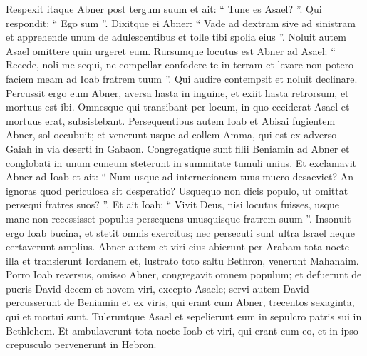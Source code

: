 \begin{biblechapter}
\begin{biblechapter}
\verse Respexit itaque Abner post tergum suum et ait: “ Tune es Asael? ”. Qui respondit: “ Ego sum ”. 
\verse Dixitque ei Abner: “ Vade ad dextram sive ad sinistram et apprehende unum de adulescentibus et tolle tibi spolia eius ”. Noluit autem Asael omittere quin urgeret eum. 
\verse Rursumque locutus est Abner ad Asael: “ Recede, noli me sequi, ne compellar confodere te in terram et levare non potero faciem meam ad Ioab fratrem tuum ”. 
\verse Qui audire contempsit et noluit declinare. Percussit ergo eum Abner, aversa hasta in inguine, et exiit hasta retrorsum, et mortuus est ibi. Omnesque qui transibant per locum, in quo ceciderat Asael et mortuus erat, subsistebant.
 \verse Persequentibus autem Ioab et Abisai fugientem Abner, sol occubuit; et venerunt usque ad collem Amma, qui est ex adverso Gaiah in via deserti in Gabaon. 
\verse Congregatique sunt filii Beniamin ad Abner et conglobati in unum cuneum steterunt in summitate tumuli unius. 
\verse Et exclamavit Abner ad Ioab et ait: “ Num usque ad internecionem tuus mucro desaeviet? An ignoras quod periculosa sit desperatio? Usquequo non dicis populo, ut omittat persequi fratres suos? ”. 
\verse Et ait Ioab: “ Vivit Deus, nisi locutus fuisses, usque mane non recessisset populus persequens unusquisque fratrem suum ”. 
\verse Insonuit ergo Ioab bucina, et stetit omnis exercitus; nec persecuti sunt ultra Israel neque certaverunt amplius. 
\verse Abner autem et viri eius abierunt per Arabam tota nocte illa et transierunt Iordanem et, lustrato toto saltu Bethron, venerunt Mahanaim. 
\verse Porro Ioab reversus, omisso Abner, congregavit omnem populum; et defuerunt de pueris David decem et novem viri, excepto Asaele; 
 \verse servi autem David percusserunt de Beniamin et ex viris, qui erant cum Abner, trecentos sexaginta, qui et mortui sunt. 
\verse Tuleruntque Asael et sepelierunt eum in sepulcro patris sui in Bethlehem. Et ambulaverunt tota nocte Ioab et viri, qui erant cum eo, et in ipso crepusculo pervenerunt in Hebron.
 

\end{biblechapter}
\end{biblechapter}
